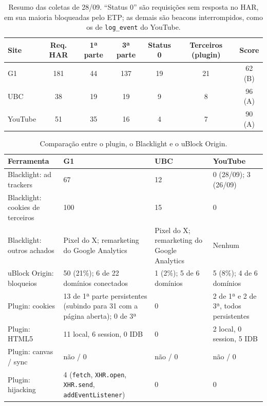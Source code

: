 \documentclass[11pt,a4paper]{article}
\begin{document}
\begin{table}[H]
\centering\small
\begin{tabular}{|l|c|c|c|c|c|c|}
\hline
\textbf{Site} & \textbf{Req. HAR} & \textbf{1ª parte} & \textbf{3ª parte} & \textbf{Status 0} & \textbf{Terceiros (plugin)} & \textbf{Score} \\ \hline
G1 & 181 & 44 & 137 & 19 & 21 & 62 (B) \\ \hline
UBC & 38 & 19 & 19 & 9 & 8 & 96 (A) \\ \hline
YouTube & 51 & 35 & 16 & 4 & 7 & 90 (A) \\ \hline
\end{tabular}
\caption{Resumo das coletas de 28/09. ``Status 0'' são requisições sem resposta no HAR, em sua maioria bloqueadas pelo ETP; as demais são beacons interrompidos, como os de \texttt{log\_event} do YouTube.}
\end{table}

\begin{table}[H]
\centering\small
\begin{tabular}{|p{3.4cm}|p{3.6cm}|p{3.6cm}|p{3.6cm}|}
\hline
\textbf{Ferramenta} & \textbf{G1} & \textbf{UBC} & \textbf{YouTube} \\ \hline
Blacklight: ad trackers & 67 & 12 & 0 (28/09); 3 (26/09) \\ \hline
Blacklight: cookies de terceiros & 100 & 15 & 0 \\ \hline
Blacklight: outros achados & Pixel do X; remarketing do Google Analytics & Pixel do X; remarketing do Google Analytics & Nenhum \\ \hline
uBlock Origin: bloqueios & 50 (21\%); 6 de 22 domínios conectados & 1 (2\%); 5 de 6 domínios & 5 (8\%); 4 de 6 domínios \\ \hline
Plugin: cookies & 13 de 1ª parte persistentes (subindo para 31 com a página aberta); 0 de 3ª & 0 & 2 de 1ª e 2 de 3ª, todos persistentes \\ \hline
Plugin: HTML5 & 11 local, 6 session, 0 IDB & 0 & 2 local, 0 session, 5 IDB \\ \hline
Plugin: canvas / sync & não / 0 & não / 0 & não / 0 \\ \hline
Plugin: hijacking & 4 (\texttt{fetch}, \texttt{XHR.\allowbreak{}open}, \texttt{XHR.\allowbreak{}send}, \texttt{addEventListener}) & 0 & 0 \\ \hline
\end{tabular}
\caption{Comparação entre o plugin, o Blacklight e o uBlock Origin.}
\end{table}
\end{document}
